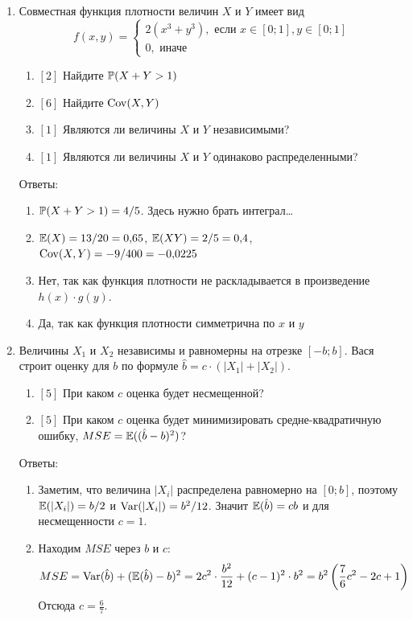 \documentclass[12pt, a4paper]{article}\usepackage[]{graphicx}\usepackage[]{color}
\begin{document}
\begin{enumerate}

\item Совместная функция плотности величин $X$ и $Y$ имеет вид
\begin{equation}
f(x,y)=\begin{cases}
2(x^3+y^3), \mbox{ если } x\in [0;1], y\in [0;1] \\
0, \mbox{ иначе}
\end{cases}
\end{equation}
\begin{enumerate}
\item $[2]$ Найдите $\P(X+Y>1)$
\item $[6]$ Найдите $\Cov(X,Y)$
\item $[1]$ Являются ли величины $X$ и $Y$ независимыми?
\item $[1]$ Являются ли величины $X$ и $Y$ одинаково распределенными?
\end{enumerate}

Ответы:
\begin{enumerate}
\item $\P(X+Y>1)=4/5$. Здесь нужно брать интеграл\ldots
\item $\E(X)=13/20=0{,}65$, $\E(XY)=2/5=0{,}4$, $\Cov(X,Y)=-9/400=-0{,}0225$
\item Нет, так как функция плотности не раскладывается в произведение $h(x)\cdot g(y)$.
\item Да, так как функция плотности симметрична по $x$ и $y$
\end{enumerate}


\item Величины $X_1$ и $X_2$ независимы и равномерны на отрезке $[-b;b]$. Вася строит оценку для $b$ по формуле $\hat{b}=c\cdot (|X_{1}|+|X_{2}|)$.
\begin{enumerate}
\item $[5]$ При каком $c$ оценка будет несмещенной?
\item $[5]$ При каком $c$ оценка будет минимизировать средне-квадратичную ошибку, $MSE=\E((\hat{b}-b)^{2})$?
\end{enumerate}

Ответы:
\begin{enumerate}
\item Заметим, что величина $|X_i|$ распределена равномерно на $[0;b]$, поэтому $\E(|X_i|)=b/2$ и $\Var(|X_i|)=b^2/12$. Значит $\E(\hat{b})=cb$ и для несмещенности $c=1$.
\item Находим $MSE$ через $b$ и $c$:
\begin{equation}
MSE=\Var(\hat{b})+(\E(\hat{b})-b)^2=2c^2\cdot \frac{b^2}{12}+(c-1)^2\cdot b^2=b^2\left(\frac{7}{6}c^2-2c+1\right)
\end{equation}
Отсюда $c=\frac{6}{7}$.
\end{enumerate}



\end{enumerate}
\end{document}
